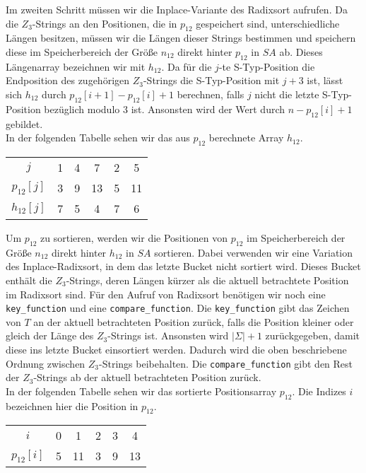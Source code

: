 Im zweiten Schritt müssen wir die Inplace-Variante des Radixsort aufrufen. Da die $Z_3$-Strings an den Positionen, die in $p_{12}$ gespeichert sind, unterschiedliche Längen besitzen, müssen wir die Längen dieser Strings bestimmen und speichern diese im Speicherbereich der Größe $n_{12}$ direkt hinter $p_{12}$ in $SA$ ab. Dieses Längenarray bezeichnen wir mit $h_{12}$. Da für die $j$-te S-Typ-Position die Endposition des zugehörigen $Z_3$-Strings die S-Typ-Position mit $j+3$ ist, lässt sich $h_{12}$ durch $p_{12}[i+1]-p_{12}[i]+1$ berechnen, falls $j$ nicht die letzte S-Typ-Position bezüglich modulo $3$ ist. Ansonsten wird der Wert durch $n-p_{12}[i]+1$ gebildet. \\
In der folgenden Tabelle sehen wir das aus $p_{12}$ berechnete Array $h_{12}$.

\begin{table}[H]
	\centering
	\begin{tabular}{c| c c c || c c }
		$j$ & 1 & 4 & 7 & 2 & 5 \\
		$p_{12}[j]$ & 3 & 9 & 13 & 5 & 11 \\
		$h_{12}[j]$ & 7 & 5 & 4 & 7 & 6 
	\end{tabular}
\end{table}

Um $p_{12}$ zu sortieren, werden wir die Positionen von $p_{12}$ im Speicherbereich der Größe $n_{12}$ direkt hinter $h_{12}$ in $SA$ sortieren. Dabei verwenden wir eine Variation des Inplace-Radixsort, in dem das letzte Bucket nicht sortiert wird. Dieses Bucket enthält die $Z_3$-Strings, deren Längen kürzer als die aktuell betrachtete Position im Radixsort sind. Für den Aufruf von Radixsort benötigen wir noch eine \texttt{key\_function} und eine \texttt{compare\_function}. Die \texttt{key\_function} gibt das Zeichen von $T$ an der aktuell betrachteten Position zurück, falls die Position kleiner oder gleich der Länge des $Z_3$-Strings ist. Ansonsten wird $|\Sigma| +1$ zurückgegeben, damit diese ins letzte Bucket einsortiert werden. Dadurch wird die oben beschriebene Ordnung zwischen $Z_3$-Strings beibehalten. Die \texttt{compare\_function} gibt den Rest der $Z_3$-Strings ab der aktuell betrachteten Position zurück. \\
In der folgenden Tabelle sehen wir das sortierte Positionsarray $p_{12}$. Die Indizes $i$ bezeichnen hier die Position in $p_{12}$.

\begin{table}[H]
	\centering
	\begin{tabular}{c| c c c c c }
		$i$ & 0 & 1 & 2 & 3 & 4 \\
		$p_{12}[i]$ & 5 & 11 & 3 & 9 & 13 
	\end{tabular}
\end{table}


